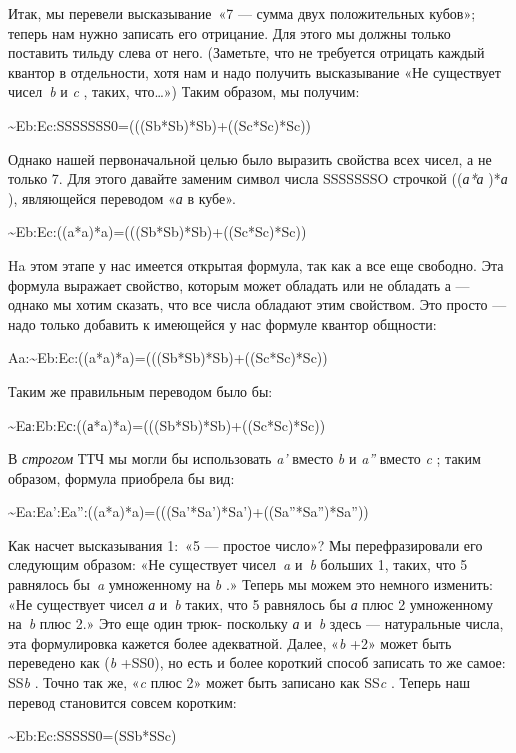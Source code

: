 \documentclass[../main.tex]{subfiles}
\begin{document}
Итак, мы перевели высказывание~«7 --- сумма двух положительных кубов»; теперь нам нужно записать его отрицание. Для этого мы должны только поставить тильду слева от него. (Заметьте, что не требуется отрицать каждый квантор в отдельности, хотя нам и надо получить высказывание «Не существует чисел~\emph{b} и \emph{c} , таких, что\ldots») Таким образом, мы получим:

\textasciitilde Eb:Ec:SSSSSSS0=(((Sb*Sb)*Sb)+((Sc*Sc)*Sc))

Однако нашей первоначальной целью было выразить свойства всех чисел, а не только 7. Для этого давайте заменим символ числа SSSSSSSO строчкой ((\emph{а*а} )*\emph{а} ), являющейся переводом «\emph{а} в кубе».

\textasciitilde Eb:Ec:((a*a)*a)=(((Sb*Sb)*Sb)+((Sc*Sc)*Sc))

Ha этом этапе у нас имеется открытая формула, так как а все еще свободно. Эта формула выражает свойство, которым может обладать или не обладать а --- однако мы хотим сказать, что все числа обладают этим свойством. Это просто --- надо только добавить к имеющейся у нас формуле квантор общности:

Aa:\textasciitilde Eb:Ec:((a*a)*a)=(((Sb*Sb)*Sb)+((Sc*Sc)*Sc))

Таким же правильным переводом было бы:

\textasciitilde Eа:Eb:Eс:((а*a)*a)=(((Sb*Sb)*Sb)+((Sc*Sc)*Sc))

В \emph{строгом} ТТЧ мы могли бы использовать \emph{a'} вместо \emph{b} и \emph{a''} вместо \emph{c} ; таким образом, формула приобрела бы вид:

\textasciitilde Ea:Ea':Ea'':((a*a)*a)=(((Sa'*Sa')*Sa')+((Sa''*Sa'')*Sa''))

Как насчет высказывания 1:~«5 --- простое число»? Мы перефразировали его следующим образом: «Не существует чисел~\emph{a} и~\emph{b} больших 1, таких, что 5 равнялось бы~\emph{a} умноженному на \emph{b} .» Теперь мы можем это немного изменить: «Не существует чисел \emph{а} и~\emph{b} таких, что 5 равнялось бы \emph{а} плюс 2 умноженному на~\emph{b} плюс 2.» Это еще один трюк- поскольку \emph{а} и~\emph{b} здесь --- натуральные числа, эта формулировка кажется более адекватной. Далее, «\emph{b} +2» может быть переведено как (\emph{b} +SS0), но есть и более короткий способ записать то же самое: SS\emph{b} . Точно так же, «\emph{c} плюс 2» может быть записано как SS\emph{c} . Теперь наш перевод становится совсем коротким:

\textasciitilde Eb:Ec:SSSSS0=(SSb*SSc)
\end{document}
